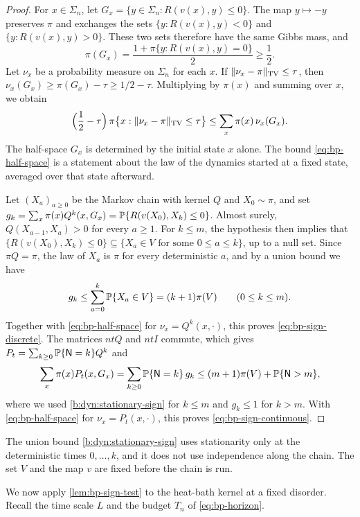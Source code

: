 \begin{proof}
For $x\in\Sigma_n$, let $G_x=\{y\in\Sigma_n:R(v(x),y)\le0\}$. The map $y\mapsto-y$ preserves $\pi$ and exchanges the sets $\{y:R(v(x),y)<0\}$ and $\{y:R(v(x),y)>0\}$. These two sets therefore have the same Gibbs mass, and
\[
 \pi(G_x)=\frac{1+\pi\{y:R(v(x),y)=0\}}2\ge\frac12.
\]
Let $\nu_x$ be a probability measure on $\Sigma_n$ for each $x$. If $\lVert \nu_x-\pi\rVert_{\mathrm{TV}}\le\tau$, then $\nu_x(G_x)\ge\pi(G_x)-\tau\ge1/2-\tau$. Multiplying by $\pi(x)$ and summing over $x$, we obtain
\begin{equation}\label{eq:bp-half-space}
 \Bigl(\frac12-\tau\Bigr)\,\pi\bigl\{x:\lVert \nu_x-\pi\rVert_{\mathrm{TV}}\le\tau\bigr\}\le\sum_x\pi(x)\,\nu_x(G_x).
\end{equation}
The half-space $G_x$ is determined by the initial state $x$ alone. The bound \eqref{eq:bp-half-space} is a statement about the law of the dynamics started at a fixed state, averaged over that state afterward.

Let $(X_a)_{a\ge0}$ be the Markov chain with kernel $Q$ and $X_0\sim\pi$, and set $g_k=\sum_x\pi(x)Q^k(x,G_x)=\mathbb P\{R(v(X_0),X_k)\le0\}$. Almost surely, $Q(X_{a-1},X_a)>0$ for every $a\ge1$. For $k\le m$, the hypothesis then implies that $\{R(v(X_0),X_k)\le0\}\subseteq\{X_a\in V\text{ for some }0\le a\le k\}$, up to a null set. Since $\pi Q=\pi$, the law of $X_a$ is $\pi$ for every deterministic $a$, and by a union bound we have
\begin{equation}\label{b:dyn:stationary-sign}
 g_k\le\sum_{a=0}^k\mathbb P\{X_a\in V\}=(k+1)\pi(V)\qquad(0\le k\le m).
\end{equation}
Together with \eqref{eq:bp-half-space} for $\nu_x=Q^k(x,\cdot)$, this proves \eqref{eq:bp-sign-discrete}. The matrices $ntQ$ and $ntI$ commute, which gives $P_t=\sum_{k\ge0}\mathbb P\{\mathsf N=k\}Q^k$ and
\[
 \sum_x\pi(x)P_t(x,G_x)=\sum_{k\ge0}\mathbb P\{\mathsf N=k\}\,g_k\le(m+1)\pi(V)+\mathbb P\{\mathsf N>m\},
\]
where we used \eqref{b:dyn:stationary-sign} for $k\le m$ and $g_k\le1$ for $k>m$. With \eqref{eq:bp-half-space} for $\nu_x=P_t(x,\cdot)$, this proves \eqref{eq:bp-sign-continuous}.
\end{proof}

The union bound \eqref{b:dyn:stationary-sign} uses stationarity only at the deterministic times $0,\dots,k$, and it does not use independence along the chain. The set $V$ and the map $v$ are fixed before the chain is run.

We now apply \cref{lem:bp-sign-test} to the heat-bath kernel at a fixed disorder. Recall the time scale $L$ and the budget $T_n$ of \eqref{eq:bp-horizon}.

